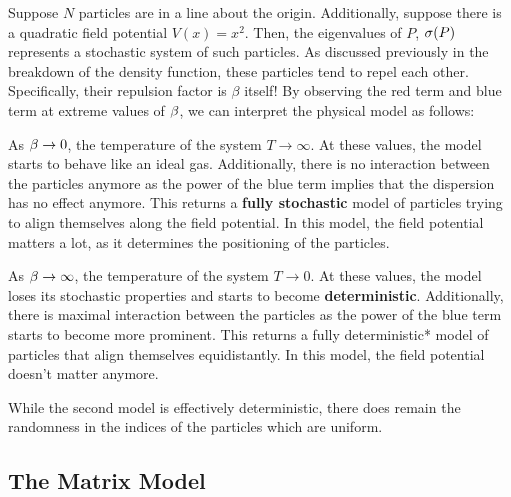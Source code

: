 
Suppose $N$ particles are in a line about the origin. Additionally, suppose there is a quadratic field potential $V(x) = x^2$.
Then, the eigenvalues of $P$, $\sigma(P)$ represents a stochastic system of such particles. As discussed previously in the breakdown of the density function,
these particles tend to repel each other. Specifically, their repulsion factor is $\beta$ itself! By observing the red term and blue term at extreme values of $\beta$,
we can interpret the physical model as follows:
\medskip

 As $\beta \to 0$, the temperature of the system $T \to \infty$.
At these values, the model starts to behave like an ideal gas.
Additionally, there is no interaction between the particles anymore as the power of the blue term implies that the dispersion has no effect anymore. This returns a \textbf{fully stochastic} model of particles trying to align themselves along the field potential. In this model, the field potential matters a lot, as it determines the positioning of the particles.

\bigskip

 As $\beta \to \infty$, the temperature of the system $T \to 0$.
At these values, the model loses its stochastic properties and starts to become \textbf{deterministic}.
Additionally, there is maximal interaction between the particles as the power of the blue term starts to become more prominent. This returns a fully deterministic*
model of particles that align themselves equidistantly. In this model, the field potential doesn't matter anymore.

\medskip

\begin{remark}
While the second model is effectively deterministic, there does remain the randomness in the indices of the particles which are uniform.
\end{remark}

\newpage
\subsection{The Matrix Model}

